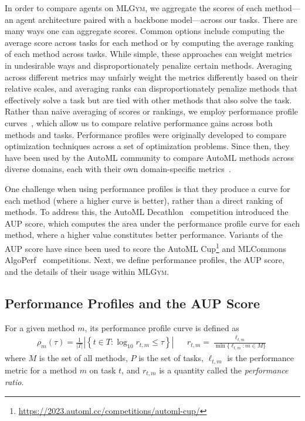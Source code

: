 \documentclass[]{fairmeta}
\newcommand{\dm}[1]{\colorbox{Emerald}{\textcolor{white}{Despoina}}\textcolor{Emerald}{\textbf{:#1}}}
\newcommand{\mlgym}{\fontfamily{lmr}\selectfont\mdseries\textsc{MLGym}\xspace}
\begin{document}
In order to compare agents on \mlgym, we aggregate the scores of each method---an agent architecture paired with a backbone model---across our tasks. 
%
There are many ways one can aggregate scores. 
%
Common options include computing the average score across tasks for each method or by computing the average ranking of each method across tasks. 
%
While simple, these approaches can weight metrics in undesirable ways and disproportionately penalize certain methods. 
%
Averaging across different metrics may unfairly weight the metrics differently based on their relative scales, and averaging ranks can disproportionately penalize methods that effectively solve a task but are tied with other methods that also solve the task. 
%
Rather than naive averaging of scores or rankings, we employ performance profile curves~\citep{dolanBenchmarkingOptimizationSoftware2002}, which allow us to compare relative performance gains across both methods and tasks. 
%
Performance profiles were originally developed to compare optimization techniques across a set of optimization problems. 
%
Since then, they have been used by the AutoML community to compare AutoML methods across diverse domains, each with their own domain-specific metrics~\citep{nasbench360,autowsbench101}. 

One challenge when using performance profiles is that they produce a curve for each method (where a higher curve is better), rather than a direct ranking of methods. 
%
To address this, the AutoML Decathlon~\citep{automldecathlon} competition introduced the AUP score, which computes the area under the performance profile curve for each method, where a higher value constitutes better performance. 
%
Variants of the AUP score have since been used to score the AutoML Cup\footnote{\url{https://2023.automl.cc/competitions/automl-cup/}} and MLCommons AlgoPerf~\citep{algoperf} competitions. 
%
Next, we define performance profiles, the AUP score, and the details of their usage within \mlgym. 

\subsection{Performance Profiles and the AUP Score}

For a given method $m$, its performance profile curve is defined as 
\begin{align}
\rho_m(\tau) = \frac{1}{|T|} \left|\left\{t \in T: \log_{10}{r_{t,m}} \leq \tau \right\}\right| 
&& 
r_{t,m} = \frac{\ell_{t,m}}{\min\{\ell_{t,m}: m \in M\}}
\end{align}
where $M$ is the set of all methods, $P$ is the set of tasks,
$\ell_{t,m}$ is the performance metric for a method $m$ on task $t$, and $r_{t,m}$ is a quantity called the \textit{performance ratio}. 
\end{document}
